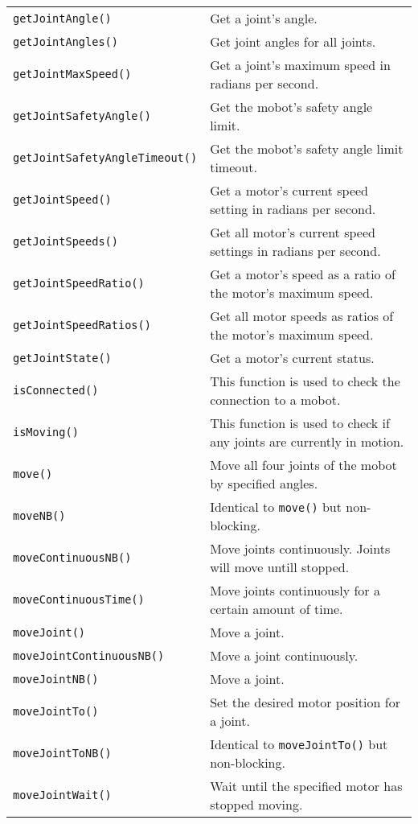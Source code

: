\begin{table}[!h]
\begin{center}
\begin{tabular}{p{48 mm}p{110 mm}}
\texttt{getJointAngle()} & Get a joint's angle. \\
\texttt{getJointAngles()} & Get joint angles for all joints. \\
\texttt{getJointMaxSpeed()} & Get a joint's maximum speed in radians per second. \\
\texttt{getJointSafetyAngle()} & Get the mobot's safety angle limit. \\
\texttt{getJointSafetyAngleTimeout()} & Get the mobot's safety angle limit timeout. \\
\texttt{getJointSpeed()} & Get a motor's current speed setting in radians per second. \\
\texttt{getJointSpeeds()} & Get all motor's current speed settings in radians per second. \\
\texttt{getJointSpeedRatio()} & Get a motor's speed as a ratio of the motor's maximum speed. \\
\texttt{getJointSpeedRatios()} & Get all motor speeds as ratios of the motor's maximum speed. \\
\texttt{getJointState()} & Get a motor's current status. \\
\texttt{isConnected()} & This function is used to check the connection to a mobot. \\
\texttt{isMoving()} & This function is used to check if any joints are currently in motion. \\
\texttt{move()} & Move all four joints of the mobot by specified angles. \\
\texttt{moveNB()} & Identical to \texttt{move()} but non-blocking. \\
\texttt{moveContinuousNB()} & Move joints continuously. Joints will move untill stopped.\\
\texttt{moveContinuousTime()} & Move joints continuously for a certain amount of time.\\
\texttt{moveJoint()} & Move a joint. \\
\texttt{moveJointContinuousNB()} & Move a joint continuously. \\
\texttt{moveJointNB()} & Move a joint. \\
\texttt{moveJointTo()} & Set the desired motor position for a joint. \\
\texttt{moveJointToNB()} & Identical to \texttt{moveJointTo()} but non-blocking. \\
\texttt{moveJointWait()} & Wait until the specified motor has stopped moving. \\

\end{tabular}
\end{center}
\end{table}
